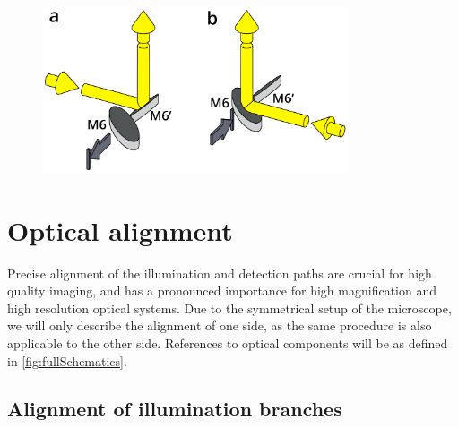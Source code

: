       \label{sec:dualMirror}
      \begin{figure}[tb]
        \centering
        \includegraphics[width=0.8\textwidth]{SW/dualMirrorFigure}
        \label{fig:dualMirror}
      \end{figure}
        
      


\section{Optical alignment}
  Precise alignment of the illumination and detection paths are crucial for high quality imaging, and has a pronounced importance for high magnification and high resolution optical systems. 
  Due to the symmetrical setup of the microscope, we will only describe the alignment of one side, as the same procedure is also applicable to the other side. References to optical components will be as defined in \autoref{fig:fullSchematics}.

  \subsection{Alignment of illumination branches}

